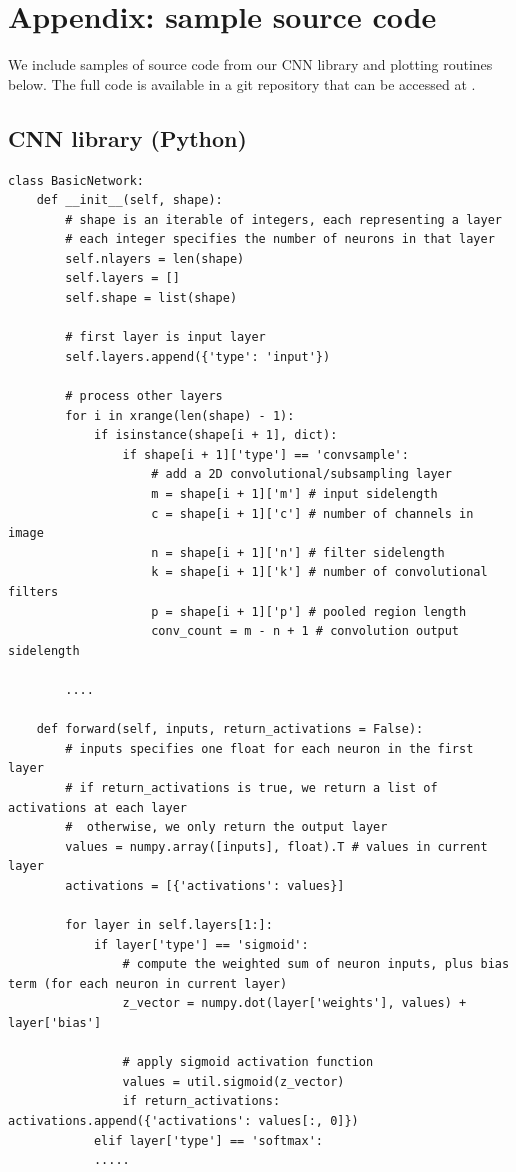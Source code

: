 \documentclass[10pt,twocolumn]{article}
\begin{document}
\section{Appendix: sample source code}

We include samples of source code from our CNN library and plotting routines below. The full code is available in a git repository that can be accessed at \cite{git:cnn}.

\subsection{CNN library (Python)}

\begin{lstlisting}
class BasicNetwork:
	def __init__(self, shape):
		# shape is an iterable of integers, each representing a layer
		# each integer specifies the number of neurons in that layer
		self.nlayers = len(shape)
		self.layers = []
		self.shape = list(shape)

		# first layer is input layer
		self.layers.append({'type': 'input'})

		# process other layers
		for i in xrange(len(shape) - 1):
			if isinstance(shape[i + 1], dict):
				if shape[i + 1]['type'] == 'convsample':
					# add a 2D convolutional/subsampling layer
					m = shape[i + 1]['m'] # input sidelength
					c = shape[i + 1]['c'] # number of channels in image
					n = shape[i + 1]['n'] # filter sidelength
					k = shape[i + 1]['k'] # number of convolutional filters
					p = shape[i + 1]['p'] # pooled region length
					conv_count = m - n + 1 # convolution output sidelength

		....

	def forward(self, inputs, return_activations = False):
		# inputs specifies one float for each neuron in the first layer
		# if return_activations is true, we return a list of activations at each layer
		#  otherwise, we only return the output layer
		values = numpy.array([inputs], float).T # values in current layer
		activations = [{'activations': values}]

		for layer in self.layers[1:]:
			if layer['type'] == 'sigmoid':
				# compute the weighted sum of neuron inputs, plus bias term (for each neuron in current layer)
				z_vector = numpy.dot(layer['weights'], values) + layer['bias']

				# apply sigmoid activation function
				values = util.sigmoid(z_vector)
				if return_activations: activations.append({'activations': values[:, 0]})
			elif layer['type'] == 'softmax':
			.....



\end{lstlisting}
\end{document}
